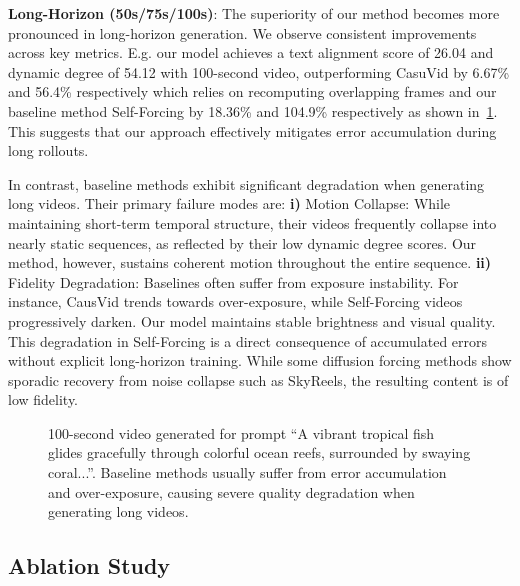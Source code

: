 \textbf{Long-Horizon (50s/75s/100s)}: The superiority of our method becomes more pronounced in long-horizon generation. We observe consistent improvements across key metrics. E.g. our model achieves a text alignment score of 26.04 and dynamic degree of 54.12 with 100-second video, outperforming CasuVid by 6.67\% and 56.4\% respectively which relies on recomputing overlapping frames and our baseline method Self-Forcing by 18.36\% and 104.9\% respectively   as shown in~\cref{fig:main}. This  suggests that our approach effectively mitigates error accumulation during long rollouts.
\begin{table}[h]
\vspace{-2pt}
  \centering
  \caption{Performance comparisons on 75s and 100s long videos. Baseline methods achieve high temporal quality scores primarily due to stagnation or degrade to pure noise.}  
  
  
  \label{tab:main_more}
\end{table}

In contrast, baseline methods exhibit significant degradation when generating long videos. Their primary failure modes are:
\textbf{i)} Motion Collapse: While maintaining short-term temporal structure, their videos frequently collapse into nearly static sequences, as reflected by their low dynamic degree scores. Our method, however, sustains coherent motion throughout the entire sequence.
\textbf{ii)} Fidelity Degradation: Baselines often suffer from exposure instability. For instance, CausVid trends towards over-exposure, while Self-Forcing videos progressively darken. Our model maintains stable brightness and visual quality. This degradation in Self-Forcing is a direct consequence of accumulated errors without explicit long-horizon training. While some diffusion forcing methods show sporadic recovery from noise collapse such as SkyReels, the resulting content is of low fidelity.
\begin{figure}[h]
    \centering
    
    \caption{100-second video generated for prompt ``A vibrant tropical fish glides gracefully through colorful ocean reefs, surrounded by swaying coral...''. Baseline methods usually suffer from error accumulation and over-exposure, causing severe quality degradation when generating long videos.}
    \label{fig:main}
\end{figure}


\subsection{Ablation Study}
